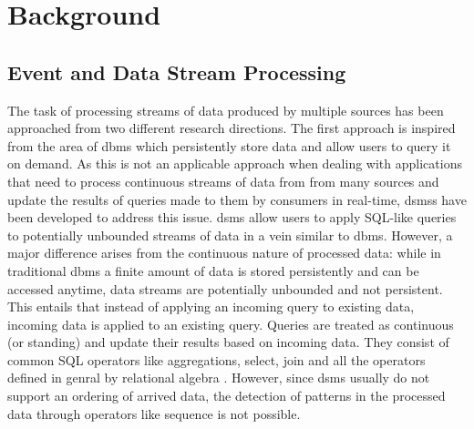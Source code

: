 \chapter{Background}


\section{Event and Data Stream Processing}


The task of processing streams of data produced by multiple sources has been approached from two different research directions. The first approach is inspired from the area of \Gls{dbms} which persistently store data and allow users to query it on demand. As this is not an applicable approach when dealing with applications that need to process continuous streams of data from from many sources and update the results of queries made to them by consumers in real-time, \glspl{dsms} have been developed to address this issue. \gls{dsms} allow users to apply SQL-like queries to potentially unbounded streams of data in a vein similar to \gls{dbms}. However, a major difference arises from the continuous nature of processed data: while in traditional \gls{dbms} a finite amount of data is stored persistently and can be accessed anytime, data streams are potentially unbounded and not persistent. This entails that instead of applying an incoming query to existing data, incoming data is applied to an existing query. Queries are treated as continuous (or standing) and update their results based on incoming data. They consist of common SQL operators like aggregations, select, join and all the operators defined in genral by relational algebra \cite{Cugola2012}. However, since \gls{dsms} usually do not support an ordering of arrived data, the detection of patterns in the processed data through operators like sequence is not possible.

